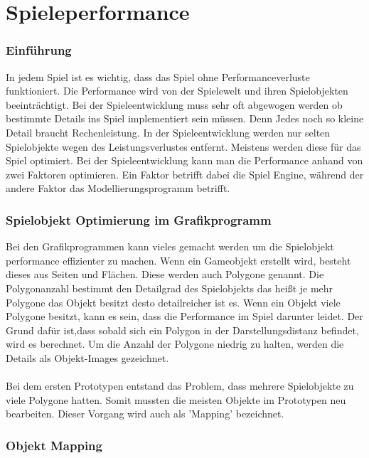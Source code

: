 
\pagebreak
{}
\chapter{Spieleperformance}



\subsection{Einführung}
In jedem Spiel ist es wichtig, dass das Spiel ohne Performanceverluste funktioniert. Die Performance wird von der Spielewelt und ihren Spielobjekten beeinträchtigt. Bei der Spieleentwicklung muss sehr oft abgewogen werden ob bestimmte Details ins Spiel implementiert sein müssen. Denn Jedes noch so kleine Detail braucht Rechenleistung. In der Spieleentwicklung werden nur selten Spielobjekte wegen des Leistungsverlustes entfernt. Meistens werden diese für das Spiel optimiert. Bei der Spieleentwicklung kann man die Performance anhand von zwei Faktoren optimieren. Ein Faktor betrifft dabei die Spiel Engine, während der andere Faktor das Modellierungsprogramm betrifft. 

\subsection{Spielobjekt Optimierung im Grafikprogramm}
Bei den Grafikprogrammen kann vieles gemacht werden um die Spielobjekt performance effizienter zu machen. Wenn ein Gameobjekt erstellt wird, besteht dieses aus Seiten und Flächen. Diese werden auch Polygone genannt. Die Polygonanzahl bestimmt den Detailgrad des Spielobjekts das heißt je mehr Polygone das Objekt besitzt desto detailreicher ist es. Wenn ein Objekt viele Polygone besitzt, kann es sein, dass die Performance im Spiel darunter leidet. Der Grund dafür ist,dass sobald sich ein Polygon in der Darstellungsdistanz befindet, wird es berechnet. Um die Anzahl der Polygone niedrig zu halten, werden die Details als \glqq Objekt-Images \grqq \space gezeichnet. \\\\ 
Bei dem ersten Prototypen entstand das Problem, dass mehrere Spielobjekte zu viele Polygone hatten. Somit mussten die meisten Objekte im Prototypen neu bearbeiten. Dieser Vorgang wird auch als 'Mapping' bezeichnet.
\pagebreak
\subsection{Objekt Mapping}

